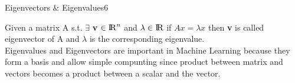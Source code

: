 \begin{questions}
\begin{question}{Eigenvectors \& Eigenvalues}{6}
\begin{answer}

Given a matrix A s.t. $\exists$ \textbf{v} $\in {\rm I\!R}^n $ and $\lambda \in {\rm I\!R}$ if  $ Ax = \lambda x $ then \textbf{v} is called eigenvector of A and $\lambda$ is the corresponding eigenvalue. \\
Eigenvalues and Eigenvectors are important in Machine Learning because they form a basis and allow simple compunting since product between matrix and vectors becomes a product between a scalar and the vector.

\end{answer}

\end{question}


\end{questions}
